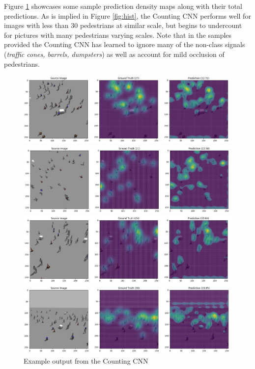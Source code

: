 \documentclass[10pt,twocolumn,letterpaper]{article}
\begin{document}
  Figure \ref{fig:ex1} showcases some sample prediction density maps along with
  their total predictions. As is implied in Figure \ref{fig:hist}, the Counting
  CNN performs well for images with less than 30 pedestrians at similar scale,
  but begins to undercount for pictures with many pedestrians varying scales.
  Note that in the samples provided the Counting CNN has learned to ignore many
  of the non-class signals (\textit{traffic cones, barrels, dumpsters}) as well
  as account for mild occlusion of pedestrians.

  \begin{figure}
  \begin{center}
  \includegraphics[width=0.9\linewidth]{img/example1.png}

  \includegraphics[width=0.9\linewidth]{img/example2.png}

  \includegraphics[width=0.9\linewidth]{img/example3.png}

  \includegraphics[width=0.9\linewidth]{img/example4.png}
  \end{center}
     \caption{Example output from the Counting CNN}
  \label{fig:ex1}
  \end{figure}
\end{document}
